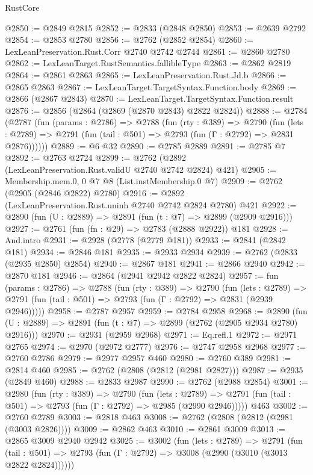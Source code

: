 \begin{lexlean}{RustCore}
\begin{coremodule}
@2850 := @2849 @2815
@2852 := @2833 (@2848 @2850)
@2853 := @2639 @2792
@2854 := @2853 @2780
@2856 := @2762 (@2852 @2854)
@2860 := LexLeanPreservation.Rust.Corr @2740 @2742 @2744
@2861 := @2860 @2780
@2862 := LexLeanTarget.RustSemantics.fallibleType
@2863 := @2862 @2819
@2864 := @2861 @2863
@2865 := LexLeanPreservation.Rust.Jd.b
@2866 := @2865 @2863
@2867 := LexLeanTarget.TargetSyntax.Function.body
@2869 := @2866 (@2867 @2843)
@2870 := LexLeanTarget.TargetSyntax.Function.result
@2876 := @2856 (@2864 (@2869 (@2870 @2843) @2822 @2824))
@2888 := @2784
    (@2787
      (fun (params : @2786) =>
      @2788
        (fun (rty : @389) =>
        @2790
          (fun (lets : @2789) =>
          @2791 (fun (tail : @501) => @2793 (fun (Γ : @2792) => @2831 @2876))))))
@2889 := @6 @32
@2890 := @2785 @2889
@2891 := @2785 @7
@2892 := @2763 @2724
@2899 := @2762 (@2892 (LexLeanPreservation.Rust.validU @2740 @2742 @2824) @421)
@2905 := Membership.mem.{0, 0} @7 @8 (List.instMembership.{0} @7)
@2909 := @2762 (@2905 (@2846 @2822) @2780)
@2916 := @2892 (LexLeanPreservation.Rust.uninh @2740 @2742 @2824 @2780) @421
@2922 := @2890 (fun (U : @2889) => @2891 (fun (t : @7) => @2899 (@2909 @2916)))
@2927 := @2761 (fun (fn : @29) => @2783 (@2888 @2922)) @181
@2928 := And.intro
@2931 := @2928 (@2778 (@2779 @181))
@2933 := @2841 (@2842 @181)
@2934 := @2846 @181
@2935 := @2933 @2934
@2939 := @2762 (@2833 (@2935 @2850) @2854)
@2940 := @2867 @181
@2941 := @2866 @2940
@2942 := @2870 @181
@2946 := @2864 (@2941 @2942 @2822 @2824)
@2957 := fun (params : @2786) =>
  @2788
    (fun (rty : @389) =>
    @2790
      (fun (lets : @2789) =>
      @2791 (fun (tail : @501) => @2793 (fun (Γ : @2792) => @2831 (@2939 @2946)))))
@2958 := @2787 @2957
@2959 := @2784 @2958
@2968 := @2890 (fun (U : @2889) => @2891 (fun (t : @7) => @2899 (@2762 (@2905 @2934 @2780) @2916)))
@2970 := @2931 (@2959 @2968)
@2971 := Eq.refl.{1}
@2972 := @2971 @2765
@2974 := @2970 (@2972 @2777)
@2976 := @2747 @2958 @2968
@2977 := @2760 @2786
@2979 := @2977 @2957 @460
@2980 := @2760 @389
@2981 := @2814 @460
@2985 := @2762 (@2808 (@2812 (@2981 @2827)))
@2987 := @2935 (@2849 @460)
@2988 := @2833 @2987
@2990 := @2762 (@2988 @2854)
@3001 := @2980
    (fun (rty : @389) =>
    @2790
      (fun (lets : @2789) =>
      @2791 (fun (tail : @501) => @2793 (fun (Γ : @2792) => @2985 (@2990 @2946)))))
    @463
@3002 := @2760 @2789
@3003 := @2818 @463
@3008 := @2762 (@2808 (@2812 (@2981 (@3003 @2826))))
@3009 := @2862 @463
@3010 := @2861 @3009
@3013 := @2865 @3009 @2940 @2942
@3025 := @3002
    (fun (lets : @2789) =>
    @2791
      (fun (tail : @501) => @2793 (fun (Γ : @2792) => @3008 (@2990 (@3010 (@3013 @2822 @2824))))))

\end{coremodule}
\end{lexlean}
